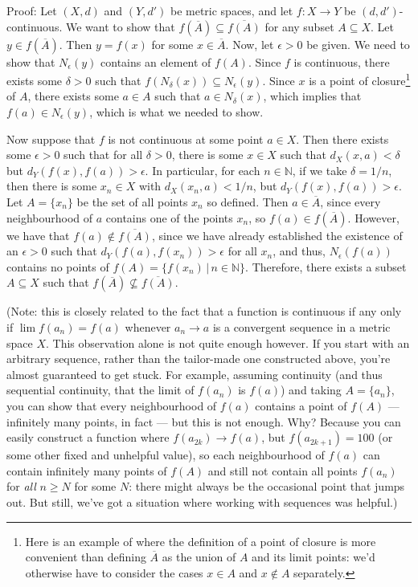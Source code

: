 \documentclass[letterpaper,12pt]{article}
\newcommand{\N}{\mathbb{N}}
\begin{document}
\begin{enumerate}
Proof: Let $(X,d)$ and $(Y,d')$ be metric spaces, and let $f:X\to Y$ be $(d,d')$-continuous. We want to show that $f(\overline{A})\subseteq \overline{f(A)}$ for any subset $A\subseteq X$. Let $y\in f(\overline{A})$. Then $y=f(x)$ for some $x\in\overline{A}$. Now, let $\epsilon>0$ be given. We need to show that $N_\epsilon(y)$ contains an element of $f(A)$. Since $f$ is continuous, there exists some $\delta>0$ such that $f(N_\delta(x))\subseteq N_\epsilon(y)$. Since $x$ is a point of closure\footnote{Here is an example of where the definition of a point of closure is more convenient than defining $\overline{A}$ as the union of $A$ and its limit points: we'd otherwise have to consider the cases $x\in A$ and $x\notin A$ separately.} of $A$, there exists some $a\in A$ such that $a\in N_\delta(x)$, which implies that $f(a)\in N_\epsilon(y)$, which is what we needed to show.

Now suppose that $f$ is not continuous at some point $a\in X$. Then there exists some $\epsilon>0$ such that for all $\delta>0$, there is some $x\in X$ such that $d_X(x,a)<\delta$ but $d_Y(f(x),f(a))>\epsilon$. In particular, for each $n\in\N$, if we take $\delta = 1/n$, then there is some $x_n\in X$ with $d_X(x_n,a)<1/n$, but $d_Y(f(x),f(a))>\epsilon$. Let $A=\{x_n\}$ be the set of all points $x_n$ so defined. Then $a\in\overline{A}$, since every neighbourhood of $a$ contains one of the points $x_n$, so $f(a)\in f(\overline{A})$. However, we have that $f(a)\notin \overline{f(A)}$, since we have already established the existence of an $\epsilon>0$ such that $d_Y(f(a),f(x_n))>\epsilon$ for all $x_n$, and thus, $N_\epsilon(f(a))$ contains no points of $f(A) = \{f(x_n)\,|\,n\in\N\}$. Therefore, there exists a subset $A\subseteq X$ such that $f(\overline{A})\nsubseteq \overline{f(A)}$.

(Note: this is closely related to the fact that a function is continuous if any only if $\lim f(a_n) = f(a)$ whenever $a_n\to a$ is a convergent sequence in a metric space $X$. This observation alone is not quite enough however. If you start with an arbitrary sequence, rather than the tailor-made one constructed above, you're almost guaranteed to get stuck. For example, assuming continuity (and thus sequential continuity, that the limit of $f(a_n)$ is $f(a)$) and taking $A=\{a_n\}$, you can show that every neighbourhood of $f(a)$ contains a point of $f(A)$ --- infinitely many points, in fact --- but this is not enough. Why? Because you can easily construct a function where $f(a_{2k})\to f(a)$, but $f(a_{2k+1})=100$ (or some other fixed and unhelpful value), so each neighbourhood of $f(a)$ can contain infinitely many points of $f(A)$ and still not contain all points $f(a_n)$ for {\em all} $n\geq N$ for some $N$: there might always be the occasional point that jumps out. But still, we've got a situation where working with sequences was helpful.)


\end{enumerate}
\end{document}
